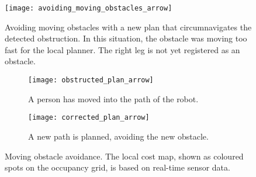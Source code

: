 \begin{figure}[p]
	\centering
	\texttt{[image: avoiding\_moving\_obstacles\_arrow]}
	\caption{Avoiding moving obstacles with a new plan that circumnavigates the detected obstruction. In this situation, the obstacle was moving too fast for the local planner. The right leg is not yet registered as an obstacle.}
	\label{fig:avoiding_moving_obstacles}
\end{figure}

\begin{figure}
	\centering
	\begin{subfigure}[b]{0.46\textwidth}
		\texttt{[image: obstructed\_plan\_arrow]}
		\caption{A person has moved into the path of the robot.}
		\label{fig:obstructed_plan}
	\end{subfigure}
	\begin{subfigure}[b]{0.472\textwidth}
		\texttt{[image: corrected\_plan\_arrow]}
		\caption{A new path is planned, avoiding the new obstacle.}
		\label{fig:corrected_plan}
	\end{subfigure}
	\caption{Moving obstacle avoidance. The local cost map, shown as coloured spots on the occupancy grid, is based on real-time sensor data. }\label{fig:obstacle_avoidance}
\end{figure}
